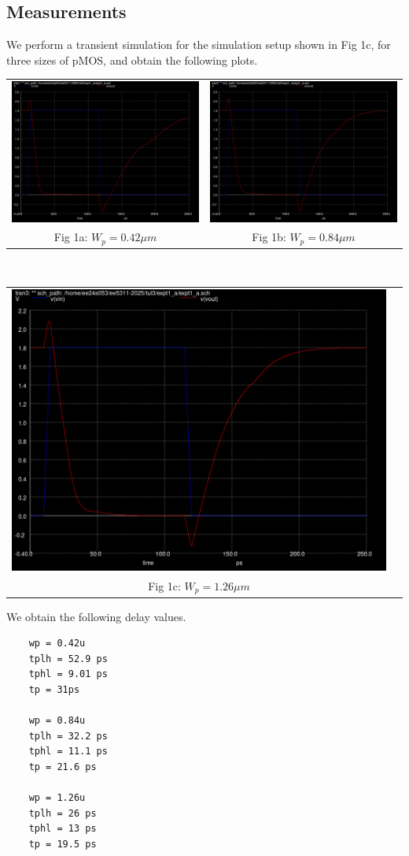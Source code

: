 \documentclass[12pt,a4paper]{article}
\begin{document}
\subsection{Measurements}
\noindent We perform a transient simulation for the simulation setup shown in Fig 1c,  for three sizes of pMOS, and obtain the following plots.
\begin{center}
\begin{tabular}{cc}
     \includegraphics[width=0.40\linewidth]{tut3/reports/media/expt1a_dly_2.png} &
     \includegraphics[width=0.40\linewidth]{tut3/reports/media/expt1a_dly_1.png} \\
     Fig 1a: $W_p = 0.42 \mu m$ & Fig 1b: $W_p = 0.84 \mu m$
\end{tabular}
\\
\begin{tabular}{cc}
     \includegraphics[width=0.40\linewidth]{tut3/reports/media/expt1a_dly_0.png} \\
     Fig 1c: $W_p = 1.26 \mu m$
\end{tabular}
\end{center}
\noindent We obtain the following delay values.
\begin{verbatim}
    wp = 0.42u
    tplh = 52.9 ps
    tphl = 9.01 ps
    tp = 31ps

    wp = 0.84u
    tplh = 32.2 ps
    tphl = 11.1 ps
    tp = 21.6 ps

    wp = 1.26u
    tplh = 26 ps
    tphl = 13 ps
    tp = 19.5 ps
\end{verbatim}
\end{document}
